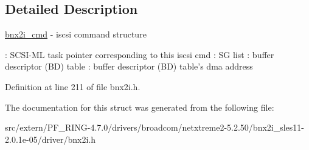 \subsection{Detailed Description}
\hyperlink{structbnx2i__cmd}{bnx2i\_\-cmd} -\/ iscsi command structure

: SCSI-\/ML task pointer corresponding to this iscsi cmd : SG list : buffer descriptor (BD) table : buffer descriptor (BD) table's dma address 

Definition at line 211 of file bnx2i.h.



The documentation for this struct was generated from the following file:\begin{DoxyCompactItemize}
\item 
src/extern/PF\_\-RING-\/4.7.0/drivers/broadcom/netxtreme2-\/5.2.50/bnx2i\_\-sles11-\/2.0.1e-\/05/driver/bnx2i.h\end{DoxyCompactItemize}
